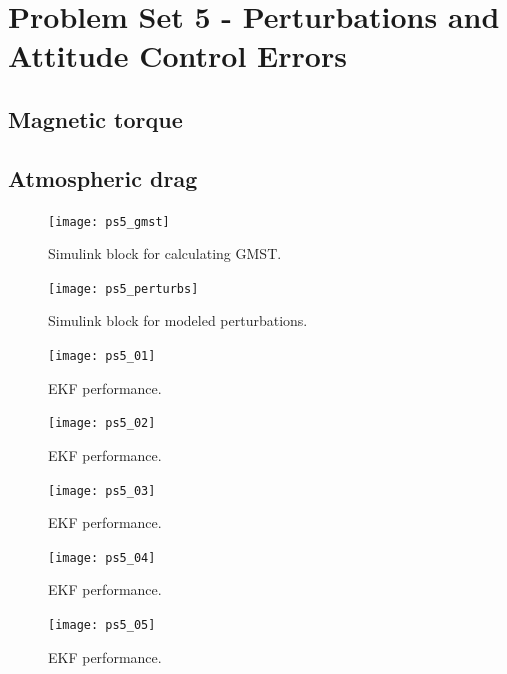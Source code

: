 \documentclass[12pt, letterpaper]{article}
\begin{document}
\section{Problem Set 5 - Perturbations and Attitude Control Errors}

\subsection{Magnetic torque}




\subsection{Atmospheric drag}





\begin{figure}[H]
	\centering
	\texttt{[image: ps5\_gmst]}
	\caption{Simulink block for calculating GMST.}
	\label{5:gmst}
\end{figure}



\begin{figure}[H]
	\centering
	\texttt{[image: ps5\_perturbs]}
	\caption{Simulink block for modeled perturbations.}
	\label{5:perturb}
\end{figure}



\begin{figure}[H]
	\centering
	\texttt{[image: ps5\_01]}
	\caption{EKF performance.}
	\label{5:ekf}
\end{figure}


\begin{figure}[H]
	\centering
	\texttt{[image: ps5\_02]}
	\caption{EKF performance.}
	\label{5:ekf}
\end{figure}


\begin{figure}[H]
	\centering
	\texttt{[image: ps5\_03]}
	\caption{EKF performance.}
	\label{5:ekf}
\end{figure}


\begin{figure}[H]
	\centering
	\texttt{[image: ps5\_04]}
	\caption{EKF performance.}
	\label{5:ekf}
\end{figure}


\begin{figure}[H]
	\centering
	\texttt{[image: ps5\_05]}
	\caption{EKF performance.}
	\label{5:ekf}
\end{figure}
\end{document}
